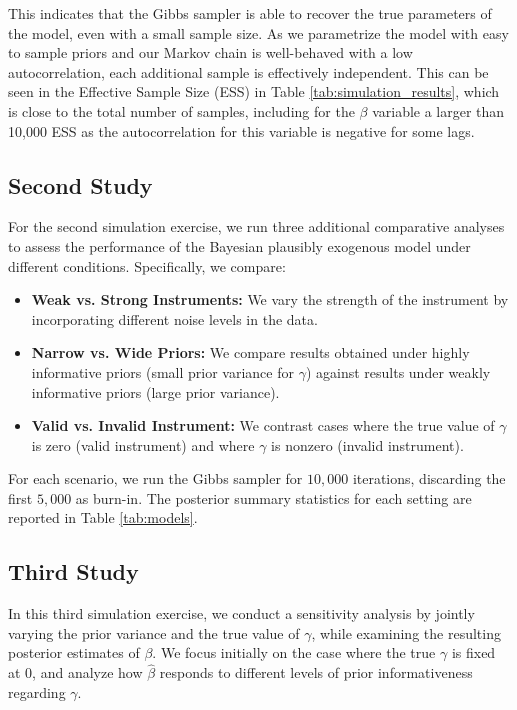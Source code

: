 This indicates that the Gibbs sampler is able to recover the true parameters of the model, even with a small sample size. As we parametrize the model with easy to sample priors and our Markov chain is well-behaved with a low autocorrelation, each additional sample is effectively independent. This can be seen in the Effective Sample Size (ESS) in Table \ref{tab:simulation_results}, which is close to the total number of samples, including for the $\beta$ variable a larger than 10,000 ESS as the autocorrelation for this variable is negative for some lags.

\subsection{Second Study}

For the second simulation exercise, we run three additional comparative analyses to assess the performance of the Bayesian plausibly exogenous model under different conditions. Specifically, we compare:

\begin{itemize}
    \item \textbf{Weak vs. Strong Instruments:} We vary the strength of the instrument by incorporating different noise levels in the data. 
    \item \textbf{Narrow vs. Wide Priors:} We compare results obtained under highly informative priors (small prior variance for $\gamma$) against results under weakly informative priors (large prior variance).
    \item \textbf{Valid vs. Invalid Instrument:} We contrast cases where the true value of $\gamma$ is zero (valid instrument) and where $\gamma$ is nonzero (invalid instrument).
\end{itemize}

For each scenario, we run the Gibbs sampler for $10{,}000$ iterations, discarding the first $5{,}000$ as burn-in. The posterior summary statistics for each setting are reported in Table \ref{tab:models}.



\subsection{Third Study}
In this third simulation exercise, we conduct a sensitivity analysis by jointly varying the prior variance and the true value of $\gamma$, while examining the resulting posterior estimates of $\beta$. We focus initially on the case where the true $\gamma$ is fixed at $0$, and analyze how $\widehat{\beta}$ responds to different levels of prior informativeness regarding $\gamma$.

